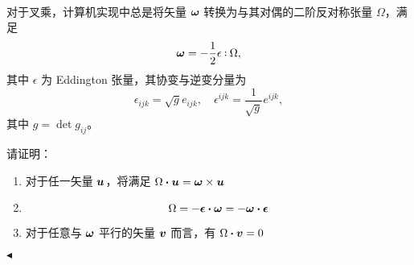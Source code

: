 \documentclass[11pt]{article}
\newenvironment{question}[2][Question]{\begin{trivlist}
\item[\hskip \labelsep {\bfseries #1}\hskip \labelsep {\bfseries #2.}]}{\hfill$\blacktriangleleft$\end{trivlist}}
\def\onedot{$\mathsurround0pt\ldotp$}
\def\cddot{%
  \mathbin{\vcenter{\baselineskip.67ex
    \hbox{\onedot}\hbox{\onedot}}%
  }}%
\begin{document}
    \begin{question}{7 (9') (矢量对偶张量)}~
    
    对于叉乘，计算机实现中总是将矢量 $\vb*{\omega}$ 转换为与其对偶的二阶反对称张量 $\Omega$，满足
    \[ \vb*{\omega} = -\frac{1}{2} \vb{\epsilon} \cddot \Omega, \]
    其中 $\epsilon$ 为 Eddington 张量，其协变与逆变分量为
    \[ \epsilon_{ijk} = \sqrt{g} e_{ijk}, \quad \epsilon^{ijk} = \frac{1}{\sqrt{g}} e^{ijk},\]
    其中 $g = \det{g_{ij}}$。
    
    请证明：
    \begin{enumerate}
        \item [*a (3')] 对于任一矢量 $\vb*{u}$，将满足 $\Omega \vdot \vb*{u} = \vb*{\omega} \times \vb*{u}$
        \item [*b (3')] \[ \Omega = -\vb*{\epsilon} \vdot \vb*{\omega} = -\vb*{\omega} \vdot \vb*{\epsilon} \]
        \item [*c (3')] 对于任意与 $\vb*{\omega}$ 平行的矢量 $\vb*{v}$ 而言，有 $\Omega \vdot \vb*{v} = 0$

    \end{enumerate}
    
    \end{question}
\end{document}
